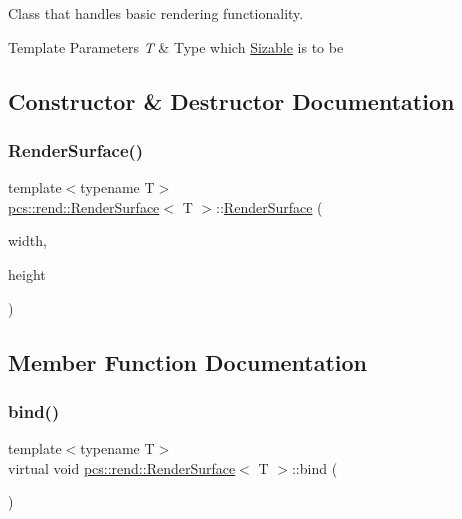 Class that handles basic rendering functionality. 


\begin{DoxyTemplParams}{Template Parameters}
{\em T} & Type which \hyperlink{structpcs_1_1Sizable}{Sizable} is to be \\
\hline
\end{DoxyTemplParams}


\subsection{Constructor \& Destructor Documentation}
\mbox{\label{classpcs_1_1rend_1_1RenderSurface_a908ee596a69b977a74270f03ecc90808}} 
\subsubsection{\texorpdfstring{Render\+Surface()}{RenderSurface()}}
{\footnotesize\ttfamily template$<$typename T$>$ \\
\hyperlink{classpcs_1_1rend_1_1RenderSurface}{pcs\+::rend\+::\+Render\+Surface}$<$ T $>$\+::\hyperlink{classpcs_1_1rend_1_1RenderSurface}{Render\+Surface} (\begin{DoxyParamCaption}\item[{const T}]{width,  }\item[{const T}]{height }\end{DoxyParamCaption})\hspace{0.3cm}{\ttfamily [inline]}}



\subsection{Member Function Documentation}
\mbox{\label{classpcs_1_1rend_1_1RenderSurface_a79c0b291ed5a7b901fe4233bf8b376f2}} 
\subsubsection{\texorpdfstring{bind()}{bind()}}
{\footnotesize\ttfamily template$<$typename T$>$ \\
virtual void \hyperlink{classpcs_1_1rend_1_1RenderSurface}{pcs\+::rend\+::\+Render\+Surface}$<$ T $>$\+::bind (\begin{DoxyParamCaption}{ }\end{DoxyParamCaption})\hspace{0.3cm}{\ttfamily [pure virtual]}}



